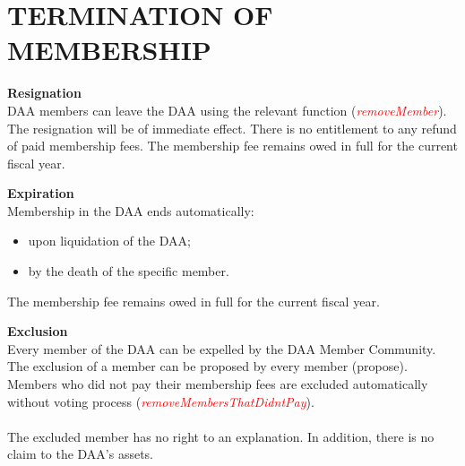 \section{TERMINATION OF MEMBERSHIP}\label{sec:termination-of-membership}

\item \textbf{Resignation} \\
DAA members can leave the DAA using the relevant function (\textcolor{red}{\emph{removeMember}}).
The resignation will be of immediate effect.
There is no entitlement to any refund of paid membership fees.
The membership fee remains owed in full for the current fiscal year.

\item \textbf{Expiration} \\
Membership in the DAA ends automatically:
\begin{itemize}
    \item upon liquidation of the DAA;
    \item by the death of the specific member.
\end{itemize}
The membership fee remains owed in full for the current fiscal year.

\item \textbf{Exclusion} \\
Every member of the DAA can be expelled by the DAA Member Community.
The exclusion of a member can be proposed by every member (propose). %
Members who did not pay their membership fees are excluded automatically without voting process (\textcolor{red}{\emph{removeMembersThatDidntPay}}). \\ \\
The excluded member has no right to an explanation.
In addition, there is no claim to the DAA’s assets.
